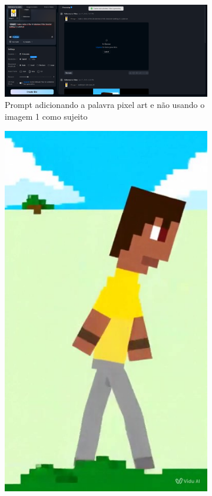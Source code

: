 \begin{figure}[htbp]
\begin{subfigure}{0.75\linewidth}
        \includegraphics[width=1\linewidth]{figs/vidu/tela2.PNG}
        \caption{\small Prompt adicionando a palavra pixel art e não usando o imagem 1 como sujeito}
        \label{fig:vidu1e}
    \end{subfigure}
    \begin{subfigure}{0.2\linewidth}
        \includegraphics[width=1\linewidth]{figs/vidu/frame3.jpg}

\end{subfigure}
\end{figure}
